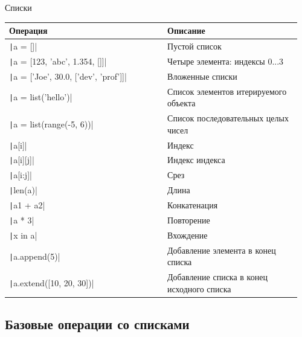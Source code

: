 \documentclass[aspectratio=169, mathserif]{beamer}%
\begin{document}
\begin{frame}[fragile]{Списки}
\begin{table}[h!]
\centering
\tiny
\begin{tabular}{|p{0.52\linewidth}|p{0.44\linewidth}|}
\hline
\textbf{Операция} & \textbf{Описание} \\
\hline
\texttt|a = []| & Пустой список \\
\texttt|a = [123, 'abc', 1.354, []]| & Четыре элемента: индексы 0...3 \\
\texttt|a = ['Joe', 30.0, ['dev', 'prof']]| & Вложенные списки \\
\texttt|a = list('hello')| & Список элементов итерируемого объекта \\
\texttt|a = list(range(-5, 6))| & Список последовательных целых чисел \\
\texttt|a[i]| & Индекс \\
\texttt|a[i][j]| & Индекс индекса \\
\texttt|a[i:j]| & Срез \\
\texttt|len(a)| & Длина \\
\texttt|a1 + a2| & Конкатенация \\
\texttt|a * 3| & Повторение \\
\texttt|x in a| & Вхождение \\
\texttt|a.append(5)| & Добавление элемента в конец списка \\
\texttt|a.extend([10, 20, 30])| & Добавление списка в конец исходного списка \\
\hline
\end{tabular}

\end{table}
\vfill
\end{frame}


\subsection{Базовые операции со списками}
\end{document}

